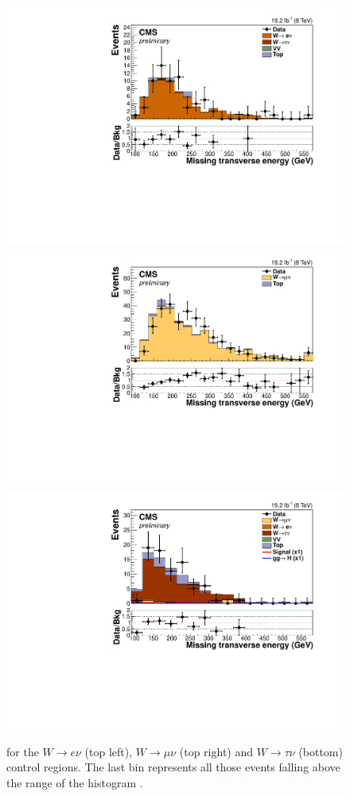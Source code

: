 \begin{figure}[!htb]
\centering
\includegraphics[width=.49\textwidth]{Chapter07/Images/output_sigreg/enu_metnomuons.pdf}
\includegraphics[width=.49\textwidth]{Chapter07/Images/output_sigreg/munu_metnomuons.pdf} \\
\includegraphics[width=.49\textwidth]{Chapter07/Images/output_sigreg/taunu_metnomuons.pdf}
\caption{\MET for the $W\rightarrow e\nu$ (top left), $W\rightarrow\mu\nu$ (top right) and $W\rightarrow\tau\nu$ (bottom) control regions. The last bin represents all those events falling above the range of the histogram \cite{ARTICLE:CMSVBFHiggsInvisibleParkedAnalysisPAS}.}
\label{fig:wmetcontplots}
\end{figure}

